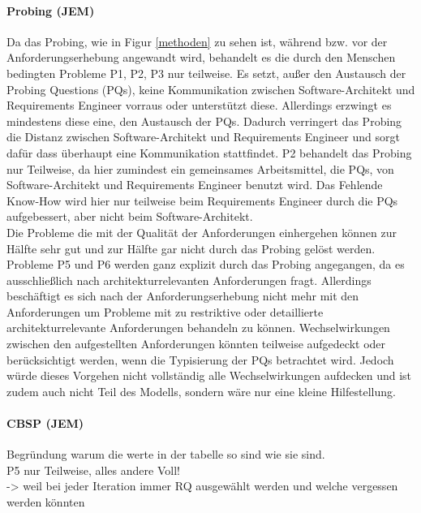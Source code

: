 \paragraph{Probing (JEM)}
Da das Probing, wie in Figur \ref{methoden} zu sehen ist, während bzw. vor der Anforderungserhebung angewandt wird, behandelt es die durch den Menschen bedingten Probleme P1, P2, P3 nur teilweise. Es setzt, außer den Austausch der Probing Questions (PQs), keine Kommunikation zwischen Software-Architekt und Requirements Engineer vorraus oder unterstützt diese. Allerdings erzwingt es mindestens diese eine, den Austausch der PQs. Dadurch verringert das Probing die Distanz zwischen Software-Architekt und Requirements Engineer und  sorgt dafür dass überhaupt eine Kommunikation stattfindet. P2 behandelt das Probing nur Teilweise, da hier zumindest ein gemeinsames Arbeitsmittel, die PQs, von Software-Architekt und Requirements Engineer benutzt wird. Das Fehlende Know-How wird hier nur teilweise beim Requirements Engineer durch die PQs aufgebessert, aber nicht beim Software-Architekt. \\
Die Probleme die mit der Qualit\"at der Anforderungen einhergehen können zur Hälfte sehr gut und zur Hälfte gar nicht durch das Probing gelöst werden. Probleme P5 und P6 werden ganz explizit durch das Probing angegangen, da es ausschließlich nach architekturrelevanten Anforderungen fragt. Allerdings beschäftigt es sich nach der Anforderungserhebung nicht mehr mit den Anforderungen um Probleme mit zu restriktive oder detaillierte architekturrelevante Anforderungen behandeln zu können. Wechselwirkungen zwischen den aufgestellten Anforderungen könnten teilweise aufgedeckt oder berücksichtigt werden, wenn die Typisierung der PQs betrachtet wird. Jedoch würde dieses Vorgehen nicht vollständig alle Wechselwirkungen aufdecken und ist zudem auch nicht Teil des Modells, sondern wäre nur eine kleine Hilfestellung. \\

\paragraph{CBSP (JEM)}
Begründung warum die werte in der tabelle so sind wie sie sind. \\
P5 nur Teilweise, alles andere Voll! \\
-> weil bei jeder Iteration immer RQ ausgewählt werden und welche vergessen werden könnten


